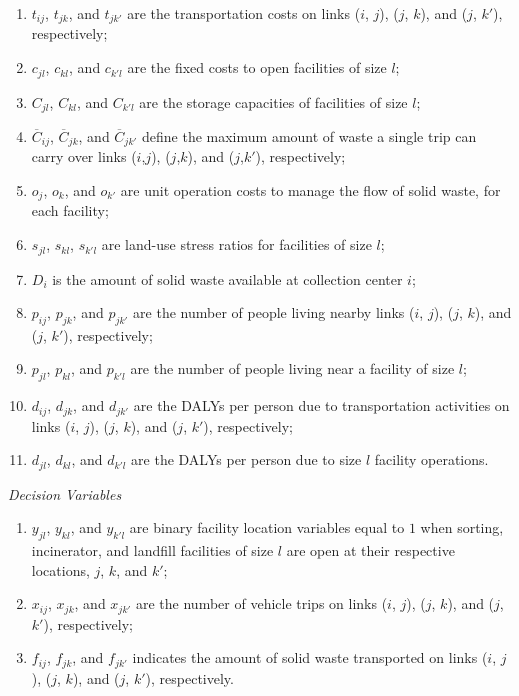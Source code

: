 \documentclass[mscthesis, 11pt]{usiinfthesis}
\theoremstyle{newdefinition}
\begin{document}
\begin{enumerate}[label=\alph*)]
\item $t_{ij}$, $t_{jk}$, and $t_{jk'}$ are the transportation costs on links ($i$, $j$), ($j$, $k$), and ($j$, $k'$), respectively;
\item $c_{jl}$, $c_{kl}$, and $c_{k'l}$ are the fixed costs to open facilities of size $l$;
\item $C_{jl}$, $C_{kl}$, and $C_{k'l}$ are the storage capacities of facilities of size $l$;
\item $\overline{C}_{ij}$, $\overline{C}_{jk}$, and $\overline{C}_{jk'}$ define the maximum amount of waste a single trip can carry over links ($i$,$j$), ($j$,$k$), and ($j$,$k'$), respectively;
\item $o_j$, $o_k$, and $o_{k'}$ are unit operation costs to manage the flow of solid waste, for each facility;
\item $s_{jl}$, $s_{kl}$, $s_{k'l}$ are land-use stress ratios for facilities of size $l$;
\item $D_i$ is the amount of solid waste available at collection center $i$;
\item $p_{ij}$, $p_{jk}$, and $p_{jk'}$ are the number of people living nearby links ($i$, $j$), ($j$, $k$), and ($j$, $k'$), respectively;
\item $p_{jl}$, $p_{kl}$, and $p_{k'l}$ are the number of people living near a facility of size $l$;
\item $d_{ij}$, $d_{jk}$, and $d_{jk'}$ are the DALYs per person due to transportation activities on links ($i$, $j$), ($j$, $k$), and ($j$, $k'$), respectively;
\item $d_{jl}$, $d_{kl}$, and $d_{k'l}$ are the DALYs per person due to size $l$ facility operations.
\end{enumerate}
\textit{Decision Variables}
\begin{enumerate}[label=\alph*)]
\item $y_{jl}$, $y_{kl}$, and $y_{k'l}$ are binary facility location variables equal to $1$ when sorting, incinerator, and landfill facilities of size $l$ are open at their respective locations, $j$, $k$, and $k'$;
\item $x_{ij}$, $x_{jk}$, and $x_{jk'}$ are the number of vehicle trips on links ($i$, $j$), ($j$, $k$), and ($j$, $k'$), respectively;
\item $f_{ij}$, $f_{jk}$, and $f_{jk'}$ indicates the amount of solid waste transported on links ($i$, $j$), ($j$, $k$), and ($j$, $k'$), respectively.
\end{enumerate}
\end{document}
